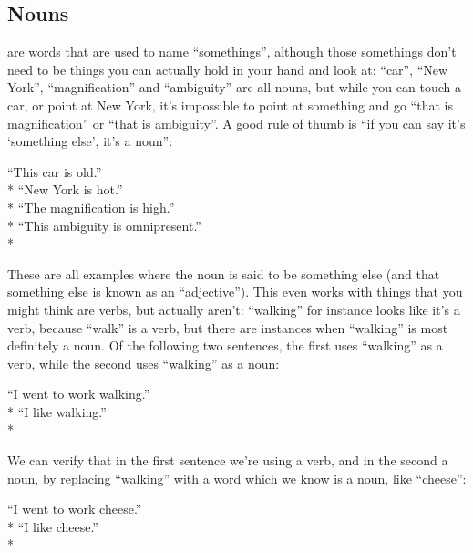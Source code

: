 \documentclass[11pt, b5paper, twoside, openright, onecolumn]{book}
\newenvironment{exampleblock}{
\setlength{\parindent}{0.6in}
\begin{minipage}[t]{\dimexpr\textwidth-\parindent}}
{\end{minipage}}
\begin{document}
\subsection{Nouns}

 are words that are used to name “somethings”‚ although those somethings don’t need to be things you can actually hold in your hand and look at: “car”‚ “New York”‚ “magnification” and “ambiguity” are all nouns‚ but while you can touch a car‚ or point at New York‚ it’s impossible to point at something and go “that is magnification” or “that is ambiguity”. A good rule of thumb is “if you can say it’s ‘something else’‚ it’s a noun”:

\vspace{0.4cm}
\begin{exampleblock}
“This car is old.” \\* 
“New York is hot.” \\* 
“The magnification is high.” \\* 
“This ambiguity is omnipresent.” \\* 
\end{exampleblock}
\vspace{0.2cm}

These are all examples where the noun is said to be something else (and that something else is known as an “adjective”). This even works with things that you might think are verbs‚ but actually aren’t: “walking” for instance looks like it’s a verb‚ because “walk” is a verb‚ but there are instances when “walking” is most definitely a noun. Of the following two sentences‚ the first uses “walking” as a verb‚ while the second uses “walking” as a noun:

\vspace{0.4cm}
\begin{exampleblock}
“I went to work walking.” \\* 
“I like walking.” \\* 
\end{exampleblock}
\vspace{0.2cm}

We can verify that in the first sentence we’re using a verb‚ and in the second a noun‚ by replacing “walking” with a word which we know is a noun‚ like “cheese”:

\vspace{0.4cm}
\begin{exampleblock}
“I went to work cheese.” \\* 
“I like cheese.” \\* 
\end{exampleblock}
\vspace{0.2cm}
\end{document}

